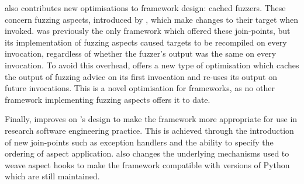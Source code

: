 \pdsfthree also contributes new optimisations to \aop{} framework design: cached
fuzzers. These concern fuzzing aspects, introduced by \pydysofu, which make
changes to their target when invoked. \pydysofu was previously the only \aop{}
framework which offered these join-points, but its implementation of fuzzing
aspects caused targets to be recompiled on every invocation, regardless of
whether the fuzzer's output was the same on every invocation. To avoid this
overhead, \pdsfthree offers a new type of optimisation which caches the output
of fuzzing advice on its first invocation and re-uses its output on future
invocations. This is a novel optimisation for \aop{} frameworks, as no other
framework implementing fuzzing aspects offers it to date.

Finally, \pdsfthree{} improves on \pydysofu{}'s design to make the framework more
appropriate for use in research software engineering practice. This is achieved
through the introduction of new join-points such as exception handlers and the
ability to specify the ordering of aspect application. \pdsfthree also changes
the underlying mechanisms used to weave aspect hooks to make the framework
compatible with versions of Python which are still maintained.



